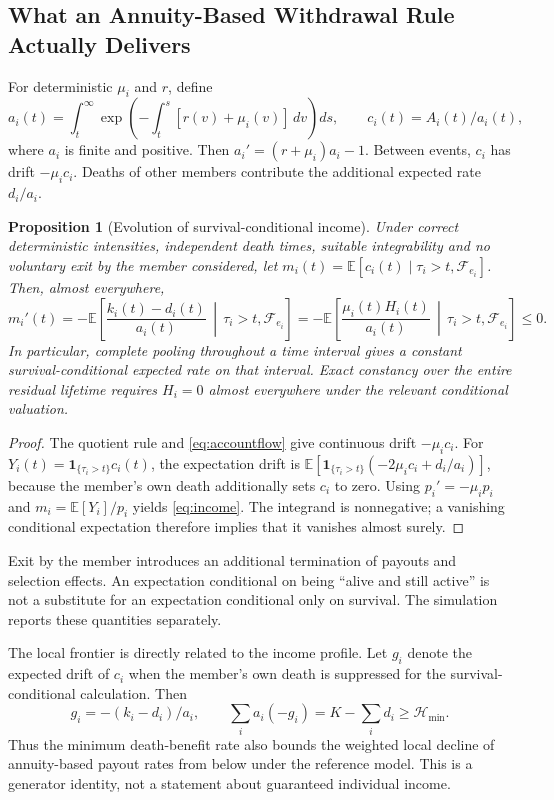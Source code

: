 \documentclass[11pt,a4paper]{article}
\newtheorem{proposition}[theorem]{Proposition}
\theoremstyle{definition}\newtheorem{definition}[theorem]{Definition}
\theoremstyle{remark}\newtheorem{remark}[theorem]{Remark}
\newcommand{\E}{\mathbb E}
\newcommand{\one}{\mathbf 1}
\newcommand{\calH}{\mathcal H}
\newcommand{\calF}{\mathcal F}
\begin{document}
\subsection{What an Annuity-Based Withdrawal Rule Actually Delivers}
For deterministic $\mu_i$ and $r$, define
\begin{equation}\label{eq:annuity}
a_i(t)=\int_t^\infty\exp\left(-\int_t^s[r(v)+\mu_i(v)]\,dv\right)ds,
\qquad c_i(t)=A_i(t)/a_i(t),
\end{equation}
where $a_i$ is finite and positive. Then $a_i'=(r+\mu_i)a_i-1$. Between events, $c_i$ has drift $-\mu_i c_i$. Deaths of other members contribute the additional expected rate $d_i/a_i$.

\begin{proposition}[Evolution of survival-conditional income]\label{prop:income}
Under correct deterministic intensities, independent death times, suitable integrability and no voluntary exit by the member considered, let
$m_i(t)=\E[c_i(t)\mid\tau_i>t,\calF_{e_i}]$. Then, almost everywhere,
\begin{equation}\label{eq:income}
m_i'(t)=-\E\left[\frac{k_i(t)-d_i(t)}{a_i(t)}\,\middle|\,\tau_i>t,\calF_{e_i}\right]
=-\E\left[\frac{\mu_i(t)H_i(t)}{a_i(t)}\,\middle|\,\tau_i>t,\calF_{e_i}\right]\le0.
\end{equation}
In particular, complete pooling throughout a time interval gives a constant survival-conditional expected rate on that interval. Exact constancy over the entire residual lifetime requires $H_i=0$ almost everywhere under the relevant conditional valuation.
\end{proposition}
\begin{proof}
The quotient rule and \eqref{eq:accountflow} give continuous drift $-\mu_i c_i$. For $Y_i(t)=\one_{\{\tau_i>t\}}c_i(t)$, the expectation drift is $\E[\one_{\{\tau_i>t\}}(-2\mu_i c_i+d_i/a_i)]$, because the member's own death additionally sets $c_i$ to zero. Using $p_i'=-\mu_i p_i$ and $m_i=\E[Y_i]/p_i$ yields \eqref{eq:income}. The integrand is nonnegative; a vanishing conditional expectation therefore implies that it vanishes almost surely.
\end{proof}
Exit by the member introduces an additional termination of payouts and selection effects. An expectation conditional on being ``alive and still active'' is not a substitute for an expectation conditional only on survival. The simulation reports these quantities separately.

The local frontier is directly related to the income profile. Let $g_i$ denote the expected drift of $c_i$ when the member's own death is suppressed for the survival-conditional calculation. Then
\[
g_i=-(k_i-d_i)/a_i,
\qquad \sum_i a_i(-g_i)=K-\sum_i d_i\ge\calH_{\min}.
\]
Thus the minimum death-benefit rate also bounds the weighted local decline of annuity-based payout rates from below under the reference model. This is a generator identity, not a statement about guaranteed individual income.
\end{document}
